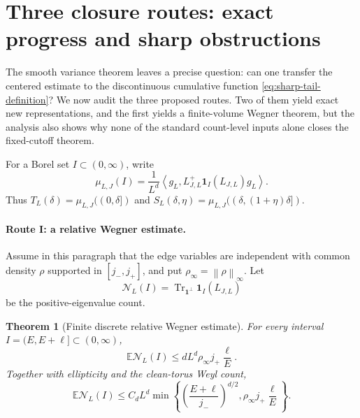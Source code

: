 \documentclass[11pt]{article}
\newtheorem{theorem}{Theorem}[section]
\theoremstyle{definition}
\theoremstyle{remark}
\newcommand{\E}{\mathbb E}
\newcommand{\ip}[2]{\left\langle #1,#2\right\rangle}
\newcommand{\norm}[1]{\left\lVert #1\right\rVert}
\begin{document}
\section{Three closure routes: exact progress and sharp obstructions}
\label{sec:three-sharp-routes}

The smooth variance theorem leaves a precise question: can one transfer the
centered estimate to the discontinuous cumulative function
\eqref{eq:sharp-tail-definition}?  We now audit the three proposed routes.
Two of them yield exact new representations, and the first yields a
finite-volume Wegner theorem, but the analysis also shows why none of the
standard count-level inputs alone closes the fixed-cutoff theorem.

For a Borel set $I\subset(0,\infty)$, write
\begin{equation}
 \mu_{L,J}(I)
 =\frac1{L^d}\ip{g_L}{L_{J,L}^+\bm{1}_I(L_{J,L})g_L}.
 \label{eq:drift-Hminus1-measure}
\end{equation}
Thus $T_L(\delta)=\mu_{L,J}((0,\delta])$ and
$S_L(\delta,\eta)=\mu_{L,J}((\delta,(1+\eta)\delta])$.

\paragraph{Route I: a relative Wegner estimate.}
Assume in this paragraph that the edge variables are independent with common
density $\rho$ supported in $[j_-,j_+]$, and put
$\rho_\infty=\norm{\rho}_{\infty}$.  Let
\begin{equation}
 \mathcal N_L(I)=\operatorname{Tr}_{\bm{1}^\perp}\bm{1}_I(L_{J,L})
 \label{eq:positive-eigenvalue-count}
\end{equation}
be the positive-eigenvalue count.

\begin{theorem}[Finite discrete relative Wegner estimate]
\label{thm:relative-Wegner}
For every interval $I=(E,E+\ell]\subset(0,\infty)$,
\begin{equation}
 \boxed{
 \E\mathcal N_L(I)
 \le dL^d\rho_\infty j_+\frac{\ell}{E}.}
 \label{eq:relative-Wegner}
\end{equation}
Together with ellipticity and the clean-torus Weyl count,
\begin{equation}
 \E\mathcal N_L(I)
 \le C_dL^d\min\left\{
 \left(\frac{E+\ell}{j_-}\right)^{d/2},
 \rho_\infty j_+\frac{\ell}{E}
 \right\}.
 \label{eq:relative-Wegner-Weyl}
\end{equation}
\end{theorem}
\end{document}
